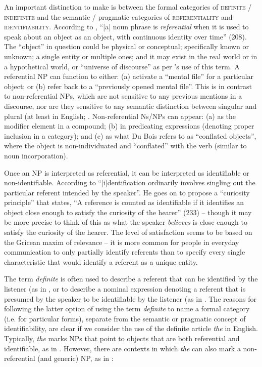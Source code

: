 \documentclass[output=paper]{langsci/langscibook}
\begin{document}
An important distinction to make is between the formal categories of \textsc{definite / indefinite }and the semantic / pragmatic categories of \textsc{referentiality} and \textsc{identifiability}. According to \cite{DoBois1980}, “[a] noun phrase is \textit{referential }when it is used to speak about an object as an object, with continuous identity over time” (208). The “object” in question could be physical or conceptual; specifically known or unknown; a single entity or multiple ones; and it may exist in the real world or in a hypothetical world, or “universe of discourse” as per \citet[388]{Givon2001}'s use of this term. A referential NP can function to either: (a) activate a “mental file” for a particular object; or (b) refer back to a “previously opened mental file”. This is in contrast to non-referential NPs, which are not sensitive to any previous mentions in a discourse, nor are they sensitive to any semantic distinction between singular and plural (at least in English; \citealt[210]{DuBois1980}. Non-referential Ns/NPs can appear: (a) as the modifier element in a compound; (b) in predicating expressions (denoting proper inclusion in a category); and (c) as what Du Bois refers to as “conflated objects”, where the object is non-individuated and “conflated” with the verb (similar to noun incorporation).

Once an NP is interpreted as referential, it can be interpreted as identifiable or non-identifiable. According to \citet[232]{DuBois1980} “[i]dentification ordinarily involves singling out the particular referent intended by the speaker”. He goes on to propose a “curiosity principle” that states, “A reference is counted as identifiable if it identifies an object close enough to satisfy the curiosity of the hearer” (233) – though it may be more precise to think of this as what the speaker \textit{believes} is close enough to satisfy the curiosity of the hearer. The level of satisfaction seems to be based on the Gricean maxim of relevance – it is more common for people in everyday communication to only partially identify referents than to specify every single characteristic that would identify a referent as a unique entity.

The term \textit{definite} is often used to describe a referent that can be identified by the listener (as in \citealt[65]{Comrie1989}, or to describe a nominal expression denoting a referent that is presumed by the speaker to be identifiable by the listener (as in \citealt[79]{Lambrecht1994}. The reasons for following the latter option of using the term \textit{definite} to name a formal category (i.e. for particular forms), separate from the semantic or pragmatic concept of identifiability, are clear if we consider the use of the definite article \textit{the} in English. Typically, \textit{the} marks NPs that point to objects that are both referential and identifiable, as in . However, there are contexts in which \textit{the }can also mark a non-referential (and generic) NP, as in :
\end{document}
